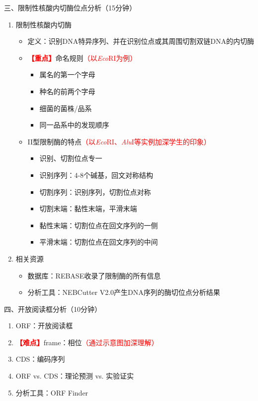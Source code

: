 \documentclass{TIJMUjiaoanLL}
\begin{document}
\vspace*{0.2cm}
\noindent
三、限制性核酸内切酶位点分析（15分钟）
\begin{enumerate}
  \item 限制性核酸内切酶
    \begin{itemize}
      \item 定义：识别DNA特异序列、并在识别位点或其周围切割双链DNA的内切酶
      \item \textcolor{red}{\textbf{【重点】}}命名规则\textcolor{red}{（以\textit{Eco}RI为例）}
        \begin{itemize}
          \item 属名的第一个字母
          \item 种名的前两个字母
          \item 细菌的菌株/品系
          \item 同一品系中的发现顺序
        \end{itemize}
    \end{itemize}


\otherTail
\newpage
\otherHeader


    \begin{itemize}
      \item II型限制酶的特点\textcolor{red}{（以\textit{Eco}RI、\textit{Alu}I等实例加深学生的印象）}
      \begin{itemize}
        \item 识别、切割位点专一
        \item 识别序列：4-8个碱基，回文对称结构
        \item 切割序列：识别序列，切割位点对称
        \item 切割末端：黏性末端，平滑末端
        \item 黏性末端：切割位点在回文序列的一侧
        \item 平滑末端：切割位点在回文序列的中间
      \end{itemize}
    \end{itemize}
  \item 相关资源
    \begin{itemize}
      \item 数据库：REBASE收录了限制酶的所有信息
      \item 分析工具：NEBCutter V2.0产生DNA序列的酶切位点分析结果
    \end{itemize}
\end{enumerate}

\vspace*{0.2cm}
\noindent
四、开放阅读框分析（10分钟）
\begin{enumerate}
  \item ORF：开放阅读框
  \item \textcolor{red}{\textbf{【难点】}}frame：相位\textcolor{red}{（通过示意图加深理解）}
  \item CDS：编码序列
  \item ORF vs. CDS：理论预测 vs. 实验证实
  \item 分析工具：ORF Finder
\end{enumerate}
\end{document}
